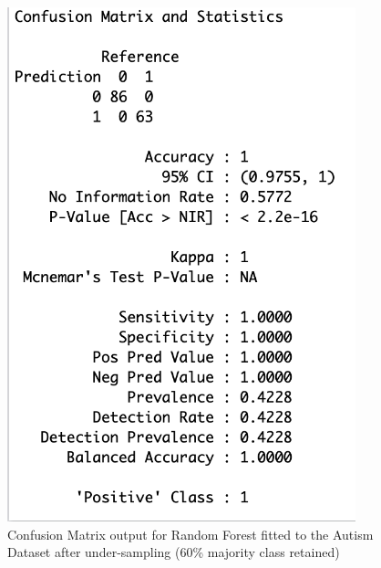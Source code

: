 \begin{figure}[!htbp]
    \centering
    \begin{minipage}{0.45\textwidth}
        \centering
        \includegraphics[width=0.9\textwidth]{ThesisTemplate/appendix/images/Chapter5Appendix/ConfusionMatrix60/Autism.png}
        \caption{Confusion Matrix output for Random Forest fitted to the Autism Dataset after under-sampling (60\% majority class retained)}
        \label{fig:matrixAutism60}
    \end{minipage}\hfill
    \begin{minipage}{0.45\textwidth}
        \centering

\end{minipage}
\end{figure}
